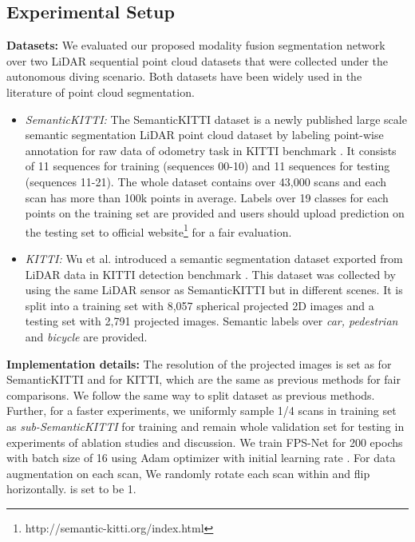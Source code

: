 \documentclass[preprint,review,3p]{elsarticle}
\begin{document}
\subsection{Experimental Setup}
\textbf{Datasets:}
We evaluated our proposed modality fusion segmentation network over two LiDAR sequential point cloud datasets that were collected under the autonomous diving scenario. Both datasets have been widely used in the literature of point cloud segmentation.
\begin{itemize}
    \item \textit{SemanticKITTI:} The SemanticKITTI dataset \cite{behley2019semantickitti} is a newly published large scale semantic segmentation LiDAR point cloud dataset by labeling point-wise annotation for raw data of odometry task in KITTI benchmark \cite{geiger2012kitti}. It consists of 11 sequences for training (sequences 00-10) and 11 sequences for testing (sequences 11-21). The whole dataset contains over 43,000 scans and each scan has more than 100k points in average. Labels over 19 classes for each points on the training set are provided and users should upload prediction on the testing set to official website\footnote{http://semantic-kitti.org/index.html} for a fair evaluation.
    \item \textit{KITTI:} Wu et al.\cite{wu2018squeezeseg} introduced a semantic segmentation dataset exported from LiDAR data in KITTI detection benchmark \cite{geiger2012kitti}. This dataset was collected by using the same LiDAR sensor as SemanticKITTI but in different scenes. It is split into a training set with 8,057 spherical projected 2D images and a testing set with 2,791 projected images. Semantic labels over \textit{car, pedestrian} and \textit{bicycle} are provided.
\end{itemize}

\textbf{Implementation details:} The resolution of the projected images is set as  for SemanticKITTI and  for KITTI, which are the same as previous methods \cite{wu2018squeezeseg,wu2019squeezesegv2,milioto2019rangenet++, biasutti2019lunet} for fair comparisons.
We follow the same way to split dataset as previous methods. Further, for a faster experiments, we uniformly sample 1/4 scans in training set as \textit{sub-SemanticKITTI} for training and remain whole validation set for testing in experiments of ablation studies and discussion. We train FPS-Net for 200 epochs with batch size of 16 using Adam optimizer with initial learning rate . For data augmentation on each scan, We randomly rotate each scan within  and flip horizontally.  is set to be 1. 
\end{document}
